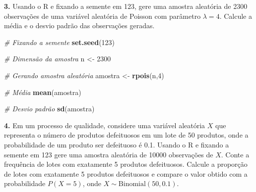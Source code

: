 \documentclass[
]{book}
\newenvironment{Shaded}{\begin{snugshade}}{\end{snugshade}}
\newcommand{\CommentTok}[1]{\textcolor[rgb]{0.56,0.35,0.01}{\textit{#1}}}
\newcommand{\DecValTok}[1]{\textcolor[rgb]{0.00,0.00,0.81}{#1}}
\newcommand{\FunctionTok}[1]{\textcolor[rgb]{0.13,0.29,0.53}{\textbf{#1}}}
\newcommand{\NormalTok}[1]{#1}
\newcommand{\OtherTok}[1]{\textcolor[rgb]{0.56,0.35,0.01}{#1}}
\begin{document}
\textbf{3.} Usando o R e fixando a semente em 123, gere uma amostra aleatória
de 2300 observações de uma variável aleatória de Poisson com parâmetro
\(\lambda = 4\). Calcule a média e o desvio padrão das observações
geradas.

\begin{Shaded}
\begin{Highlighting}[]
\CommentTok{\# Fixando a semente}
\FunctionTok{set.seed}\NormalTok{(}\DecValTok{123}\NormalTok{)}

\CommentTok{\# Dimensão da amostra}
\NormalTok{n }\OtherTok{\textless{}{-}} \DecValTok{2300}

\CommentTok{\# Gerando amostra aleatória}
\NormalTok{amostra }\OtherTok{\textless{}{-}} \FunctionTok{rpois}\NormalTok{(n,}\DecValTok{4}\NormalTok{)}

\CommentTok{\# Média}
\FunctionTok{mean}\NormalTok{(amostra)}

\CommentTok{\# Desvio padrão}
\FunctionTok{sd}\NormalTok{(amostra)}
\end{Highlighting}
\end{Shaded}

\textbf{4.} Em um processo de qualidade, considere uma variável aleatória \(X\)
que representa o número de produtos defeituosos em um lote de 50
produtos, onde a probabilidade de um produto ser defeituoso é 0.1.
Usando o R e fixando a semente em 123 gere uma amostra aleatória de
10000 observações de \(X\). Conte a frequência de lotes com exatamente 5
produtos defeituosos. Calcule a proporção de lotes com exatamente 5
produtos defeituosos e compare o valor obtido com a probabilidade
\(P(X=5)\), onde \(X \sim \text{Binomial}(50, 0.1)\).
\end{document}
